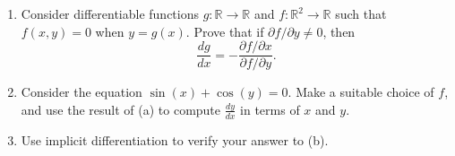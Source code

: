 \begin{problem}
\begin{enumerate}
\item Consider differentiable functions $g:\mathbb{R}\rightarrow\mathbb{R}$ and $f:\mathbb{R}^2\rightarrow \mathbb{R}$ such that $f(x,y)=0$ when $y=g(x)$. Prove that if $\partial f/\partial y\neq 0$, then
\[
\frac{dg}{dx} = -\frac{\partial f/\partial x}{\partial f/\partial y}.
\]
\item Consider the equation $\sin(x) + \cos(y) = 0$.
Make a suitable choice of $f$, and use the result of (a) to compute $\frac{dy}{dx}$ in terms of $x$ and $y$.
\item Use implicit differentiation to verify your answer to (b).
\end{enumerate}
\end{problem}